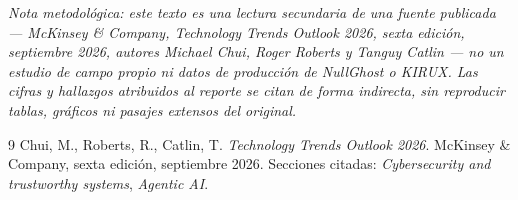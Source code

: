 \documentclass[10pt]{article}
\begin{document}
\vspace{0.6em}
{\small\itshape Nota metodológica: este texto es una lectura secundaria de una fuente publicada --- McKinsey \& Company, \emph{Technology Trends Outlook 2026}, sexta edición, septiembre 2026, autores Michael Chui, Roger Roberts y Tanguy Catlin --- no un estudio de campo propio ni datos de producción de NullGhost o KIRUX. Las cifras y hallazgos atribuidos al reporte se citan de forma indirecta, sin reproducir tablas, gráficos ni pasajes extensos del original.}

\begin{thebibliography}{9}
Chui, M., Roberts, R., Catlin, T. \emph{Technology Trends Outlook 2026}. McKinsey \& Company, sexta edición, septiembre 2026. Secciones citadas: \emph{Cybersecurity and trustworthy systems}, \emph{Agentic AI}.
\end{thebibliography}
\end{document}
